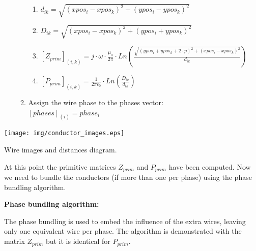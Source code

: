 \documentclass[nols,a4paper,twoside,notoc,fleqn]{tufte-book}
\begin{document}
\begin{enumerate}
\begin{enumerate}
		\begin{enumerate}
			\item $d_{ik} = \sqrt{(xpos_i - xpos_k)^2 + (ypos_i - ypos_k)^2}$
			
			\item $D_{ik} = \sqrt{(xpos_i - xpos_k)^2 + (ypos_i + ypos_k)^2}$
			
			
			\item $\left[Z_{prim}\right]_{(i, k)}= j \cdot \omega \cdot \frac{ \mu_0}{2 \pi} \cdot Ln \left(\frac{ \sqrt{(ypos_i + ypos_k + 2 \cdot p)^2 + (xpos_i - xpos_k)^2} }{d_{ik}} \right)$
			
			\item $\left[P_{prim}\right]_{(i,k)} = \frac{1}{2 \pi \epsilon_0} \cdot Ln \left( \frac{D_{ik}}{ d_{ik}} \right)$
			
		\end{enumerate}
	
		\item Assign the wire phase to the phases vector:\\ $\left[phases\right]_{(i)} = phase_i$
		
	\end{enumerate}
\end{enumerate}

\begin{marginfigure}
	\texttt{[image: img/conductor\_images.eps]}
	\caption{Wire images and distances diagram.}
	\label{wires_images}
\end{marginfigure}

At this point the primitive matrices $Z_{prim}$ and $P_{prim}$ have been computed. Now we need to bundle the conductors (if more than one per phase) using the phase bundling algorithm.
 
\vspace{0.3cm}
\textbf{Phase bundling algorithm:}

The phase bundling is used to embed the influence of the extra wires, leaving only one equivalent wire per phase. The algorithm is demonstrated with the matrix $Z_{prim}$ but it is identical for $P_{prim}$.
\end{document}

